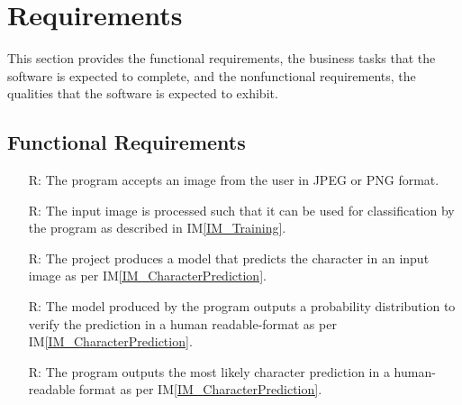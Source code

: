 \documentclass[12pt]{article}
\newcounter{reqnum} %
\begin{document}

\section{Requirements}


This section provides the functional requirements, the business tasks that the
software is expected to complete, and the nonfunctional requirements, the
qualities that the software is expected to exhibit.

\subsection{Functional Requirements}

\noindent \begin{itemize}

\item[R\refstepcounter{reqnum}\thereqnum \label{R_Inputs}:] The program accepts
an image from the user in JPEG or PNG format.


\item[R\refstepcounter{reqnum}\thereqnum \label{R_OutputInputs}:] The input
image is processed such that it can be used for classification by the program as
described in IM\ref{IM_Training}.


\item[R\refstepcounter{reqnum}\thereqnum \label{R_Calculate}:] The \progname{}
project produces a model that predicts the character in an input image as per
IM\ref{IM_CharacterPrediction}.



\item[R\refstepcounter{reqnum}\thereqnum \label{R_VerifyOutput}:] The model
produced by the program outputs a probability distribution to verify the prediction in
a human readable-format as per IM\ref{IM_CharacterPrediction}.


\item[R\refstepcounter{reqnum}\thereqnum \label{R_Output}:] The program outputs
the most likely character prediction in a human-readable format as per
IM\ref{IM_CharacterPrediction}.


\end{itemize}
\end{document}
